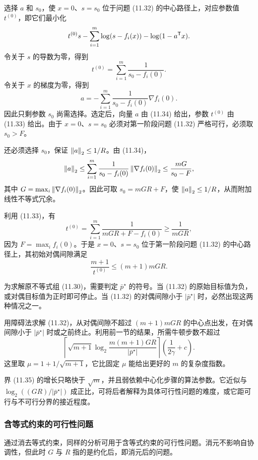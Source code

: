 选择 $a$ 和 $s_0$，使 $x=0$、$s=s_0$ 位于问题 (11.32) 的中心路径上，对应参数值 $t^{(0)}$，即它们最小化
\[
t^{(0)}s-\sum_{i=1}^m\log(s-f_i(x))-\log(1-a^\mathsf T x).
\]
令关于 $s$ 的导数为零，得到
\begin{equation}
t^{(0)}=\sum_{i=1}^m\frac1{s_0-f_i(0)}.\tag{11.33}
\end{equation}
令关于 $x$ 的梯度为零，得到
\begin{equation}
a=-\sum_{i=1}^m\frac1{s_0-f_i(0)}\nabla f_i(0).\tag{11.34}
\end{equation}
因此只剩参数 $s_0$ 尚需选择。选定后，向量 $a$ 由 (11.34) 给出，参数 $t^{(0)}$ 由 (11.33) 给出。由于 $x=0$、$s=s_0$ 必须对第一阶段问题 (11.32) 严格可行，必须取 $s_0>F$。

还必须选择 $s_0$，保证 $\left\lVert a\right\rVert_2\le1/R$。由 (11.34)，
\[
\left\lVert a\right\rVert_2\le\sum_{i=1}^m\frac1{s_0-f_i(0)}\left\lVert \nabla f_i(0)\right\rVert_2\le\frac{mG}{s_0-F},
\]
其中 $G=\max_i\left\lVert \nabla f_i(0)\right\rVert_2$。因此可取 $s_0=mGR+F$，使 $\left\lVert a\right\rVert_2\le1/R$，从而附加线性不等式冗余。

利用 (11.33)，有
\[
t^{(0)}=\sum_{i=1}^m\frac1{mGR+F-f_i(0)}\ge\frac1{mGR},
\]
因为 $F=\max_i f_i(0)$。于是 $x=0$、$s=s_0$ 位于第一阶段问题 (11.32) 的中心路径上，其初始对偶间隙满足
\[
\frac{m+1}{t^{(0)}}\le(m+1)mGR.
\]

为求解原不等式组 (11.30)，需要判定 $\bar p^\star$ 的符号。当 (11.32) 的原始目标值为负，或对偶目标值为正时即可停止。当 (11.32) 的对偶间隙小于 $|\bar p^\star|$ 时，必然出现这两种情况之一。

用障碍法求解 (11.32)，从对偶间隙不超过 $(m+1)mGR$ 的中心点出发，在对偶间隙小于 $|\bar p^\star|$ 时或之前终止。利用前一节的结果，所需牛顿步数不超过
\begin{equation}
\left\lceil\sqrt{m+1}\log_2\frac{m(m+1)GR}{|\bar p^\star|}\right\rceil
\left(\frac1{2\gamma}+c\right).\tag{11.35}
\end{equation}
这里取 $\mu=1+1/\sqrt{m+1}$，它比固定 $\mu$ 能给出更好的 $m$ 的复杂度指数。

界 (11.35) 的增长只略快于 $\sqrt m$，并且弱依赖中心化步骤的算法参数。它近似与 $\log_2((GR)/|\bar p^\star|)$ 成正比，可将后者解释为具体可行性问题的难度，或它距可行与不可行分界的接近程度。

\subsubsection*{含等式约束的可行性问题}
通过消去等式约束，同样的分析可用于含等式约束的可行性问题。消元不影响自协调性，但此时 $G$ 与 $R$ 指的是约化后，即消元后的问题。

